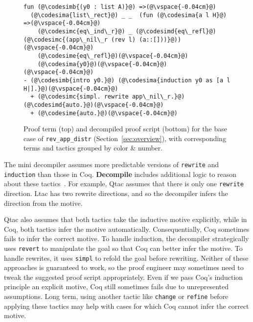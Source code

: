 \begin{figure}
\begin{lstlisting}
fun (@\codesimb{(y0 : list A)}@) =>(@\vspace{-0.04cm}@)
  (@\codesima{list\_rect}@) _ _  (fun (@\codesima{a l H}@) =>(@\vspace{-0.04cm}@)
    (@\codesimc{eq\_ind\_r}@) _ (@\codesimd{eq\_refl}@) (@\codesimc{(app\_nil\_r (rev l) (a::[]))}@))(@\vspace{-0.04cm}@)
    (@\codesime{eq\_refl}@)(@\vspace{-0.04cm}@)
    (@\codesima{y0}@)(@\vspace{-0.04cm}@)
(@\vspace{-0.04cm}@)
- (@\codesimb{intro y0.}@) (@\codesima{induction y0 as [a l H|].}@)(@\vspace{-0.04cm}@)
  + (@\codesimc{simpl. rewrite app\_nil\_r.}@) (@\codesimd{auto.}@)(@\vspace{-0.04cm}@)
  + (@\codesime{auto.}@)(@\vspace{-0.04cm}@)
\end{lstlisting}
\vspace{-0.3cm}
\caption{Proof term (top) and decompiled proof script (bottom) for the base case of 
\lstinline{rev_app_distr} (Section~\ref{sec:overview}), with corresponding terms and tactics 
grouped by color \& number.}
\label{fig:rainbow}
\end{figure}

The mini decompiler assumes more predictable versions of \lstinline{rewrite} and \lstinline{induction}
than those in Coq. \textbf{Decompile} includes additional logic to reason about these tactics~\href{https://github.com/uwplse/coq-plugin-lib/blob/9ef05815c261de9c99b604c6b581ba1c4fbc1a46/src/coq/decompiler/decompiler.ml}{}. %
For example, Qtac assumes that there is only one \lstinline{rewrite} direction. Ltac has two rewrite directions,
and so the decompiler infers the direction from the motive.

Qtac also assumes that both tactics take the inductive motive explicitly,
while in Coq, both tactics infer the motive automatically.
Consequentially, Coq sometimes fails to infer the correct motive.
To handle induction, the decompiler strategically uses \lstinline{revert} to manipulate the goal
so that Coq can better infer the motive.
To handle rewrites, it uses \lstinline{simpl} to refold the goal before rewriting.
Neither of these approaches is guaranteed to work, so the proof engineer may sometimes need to tweak the suggested proof script appropriately.
Even if we pass Coq's induction principle an explicit motive, Coq still sometimes fails due
to unrepresented assumptions.
Long term, using another tactic like \lstinline{change} or \lstinline{refine} before applying these tactics
may help with cases for which Coq cannot infer the correct motive.


